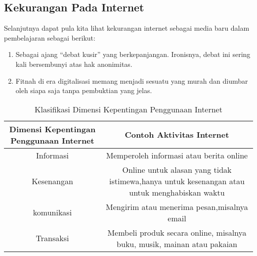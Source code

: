 \documentclass[12pt, a4paper]{article}
\begin{document}
\subsection{Kekurangan Pada Internet}
    Selanjutnya dapat pula kita lihat kekurangan internet sebagai media baru dalam pembelajaran  sebagai berikut:
\begin{enumerate}
\item Sebagai ajang “debat kusir” yang berkepanjangan. Ironisnya, debat ini sering kali bersembunyi atas hak anonimitas.
\item Fitnah di era digitalisasi memang menjadi sesuatu yang murah dan diumbar oleh siapa saja tanpa pembuktian yang jelas.
\end{enumerate}

\begin{table}[h]
\begin{center}
\begin{tabular}{|c|c|}
\hline
Dimensi Kepentingan Penggunaan Internet&Contoh Aktivitas Internet\\
\hline
Informasi&Memperoleh informasi atau berita online\\
Kesenangan&Online untuk alasan yang tidak istimewa,hanya untuk kesenangan atau untuk menghabiskan waktu\\
komunikasi&Mengirim atau menerima pesan,misalnya email\\
Transaksi&Membeli produk secara online, misalnya buku, musik, mainan atau pakaian\\
\hline
\end{tabular}
\caption{Klasifikasi Dimensi Kepentingan Penggunaan Internet}
\end{center}
\end{table}
\end{document}
